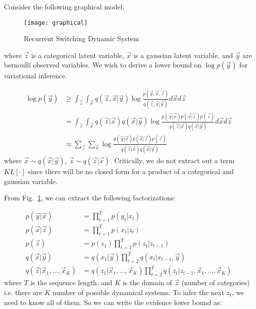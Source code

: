 \documentclass[12pt]{article}
\begin{document}
Consider the following graphical model:

\begin{figure}[h]
\centering
\texttt{[image: graphical]}
\caption{Recurrent Switching Dynamic System}
\label{mode}
\end{figure}

where $\vec{z}$ is a categorical latent variable, $\vec{x}$ is a gaussian latent variable, and $\vec{y}$ are bernoulli observed variables. We wish to derive a lower bound on $\log p(\vec{y})$ for variational inference.

\begin{align}
    \log p(\vec{y}) &\geq \int_{\vec{z}} \int_{\vec{x}} q(\vec{z},\vec{x}|\vec{y}) \log \frac{p(\vec{y},\vec{x},\vec{z})}{q(\vec{z},\vec{x}|\vec{y})} d\vec{x} d\vec{z} \\
                    &= \int_{\vec{z}} \int_{\vec{x}} q(\vec{z}|\vec{x})q(\vec{x}|\vec{y}) \log \frac{p(\vec{y}|\vec{x})p(\vec{x}|\vec{z})p(\vec{z})}{q(\vec{z}|\vec{x})q(\vec{x}|\vec{y})} d\vec{x} d\vec{z} \\
                    &\approx \sum_{\vec{z}} \sum_{\vec{x}} \log \frac{p(\vec{y}|\vec{x})p(\vec{x}|\vec{z})p(\vec{z})}{q(\vec{z}|\vec{x})q(\vec{x}|\vec{y})}
\end{align}
where $\vec{x} \sim q(\vec{x}|\vec{y})$, $\vec{z} \sim q(\vec{z}|\vec{x})$. Critically, we do not extract out a term $KL[\cdot]$ since there will be no closed form for a product of a categorical and gaussian variable.

From Fig.~\ref{mode}, we can extract the following factorizations:

\begin{align}
    p(\vec{y}|\vec{x}) &= \prod_{t=1}^{T} p(y_t|x_t) \\
    p(\vec{x}|\vec{z}) &= \prod_{t=1}^{T} p(x_t|z_t) \\
    p(\vec{z}) &= p(z_1)\prod_{t=2}^{T} p(z_t|z_{t-1}) \\
    q(\vec{x}|\vec{y}) &= q(x_1|\vec{y})\prod_{t=2}^{T} q(x_t|x_{t-1},\vec{y}) \\
    q(\vec{z}|\vec{x}_1, ..., \vec{x}_K) &= q(z_1|\vec{x}_1, ..., \vec{x}_K)\prod_{t=2}^{T} q(z_t|z_{t-1},\vec{x}_1, ..., \vec{x}_K)
\end{align}
where $T$ is the sequence length, and $K$ is the domain of $\vec{z}$ (number of categories) i.e. there are $K$ number of possible dynamical systems. To infer the next $z_t$, we need to know all of them. So we can write the evidence lower bound as:
\end{document}
